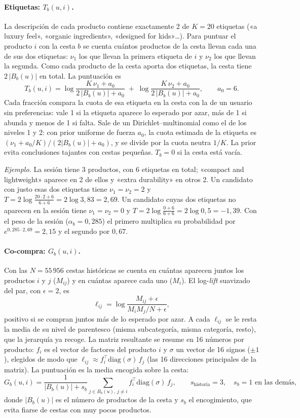 \documentclass[11pt,a4paper]{article}
\begin{document}
\paragraph{Etiquetas: $T_b(u,i)$.} La descripción de cada producto contiene exactamente 2 de $K=20$
etiquetas («a luxury feel», «organic ingredients», «designed for kids»\dots). Para puntuar el producto
$i$ con la cesta $b$ se cuenta cuántos productos de la cesta llevan cada una de sus dos etiquetas:
$\nu_1$ los que llevan la primera etiqueta de $i$ y $\nu_2$ los que llevan la segunda. Como cada producto
de la cesta aporta dos etiquetas, la cesta tiene $2\,|B_b(u)|$ en total. La puntuación es
\[
T_b(u,i)=\log\frac{K\,\nu_1+a_0}{2\,|B_b(u)|+a_0}\;+\;\log\frac{K\,\nu_2+a_0}{2\,|B_b(u)|+a_0},
\qquad a_0=6 .
\]
Cada fracción compara la cuota de esa etiqueta en la cesta con la de un usuario sin preferencias: vale
1 si la etiqueta aparece lo esperado por azar, más de 1 si abunda y menos de 1 si falta. Sale de un
Dirichlet--multinomial como el de los niveles 1 y 2: con prior uniforme de fuerza $a_0$, la cuota
estimada de la etiqueta es $(\nu_1+a_0/K)/(2|B_b(u)|+a_0)$, y se divide por la cuota neutra $1/K$. La
prior evita conclusiones tajantes con cestas pequeñas. $T_b=0$ si la cesta está vacía.

\emph{Ejemplo.} La sesión tiene 3 productos, con 6 etiquetas en total; «compact and lightweight» aparece
en 2 de ellos y «extra durability» en otros 2. Un candidato con justo esas dos etiquetas tiene
$\nu_1=\nu_2=2$ y
$T=2\log\frac{20\cdot2+6}{6+6}=2\log 3{,}83=2{,}69$. Un candidato cuyas dos etiquetas no aparecen en
la sesión tiene $\nu_1=\nu_2=0$ y $T=2\log\frac{0+6}{6+6}=2\log 0{,}5=-1{,}39$. Con el peso de
la sesión ($\alpha_b=0{,}285$) el primero multiplica su probabilidad por $e^{0{,}285\cdot2{,}69}=2{,}15$ y el
segundo por $0{,}67$.

\paragraph{Co-compra: $G_b(u,i)$.} Con las $N=55\,956$ cestas históricas se cuenta en cuántas aparecen
juntos los productos $i$ y $j$ ($M_{ij}$) y en cuántas aparece cada uno ($M_i$). El log-\emph{lift}
suavizado del par, con $\epsilon=2$, es
\[
\ell_{ij}=\log\frac{M_{ij}+\epsilon}{M_iM_j/N+\epsilon},
\]
positivo si se compran juntos más de lo esperado por azar. A cada $\ell_{ij}$ se le resta la media de su
nivel de parentesco (misma subcategoría, misma categoría, resto), que la jerarquía ya recoge. La matriz
resultante se resume en 16 números por producto: $f_i$ es el vector de factores del producto $i$ y
$\sigma$ un vector de 16 signos ($\pm1$), elegidos de modo que
$\ell_{ij}\approx f_i^{\top}\mathrm{diag}(\sigma)\,f_j$ (las 16 direcciones principales de la matriz). La
puntuación es la media encogida sobre la cesta:
\[
G_b(u,i)=\frac{1}{|B_b(u)|+s_b}\sum_{j\in B_b(u),\,j\neq i} f_i^{\top}\mathrm{diag}(\sigma)\,f_j ,
\qquad s_{\text{historia}}=3,\quad s_b=1\text{ en las demás},
\]
donde $|B_b(u)|$ es el número de productos de la cesta y $s_b$ el encogimiento, que evita fiarse de
cestas con muy pocos productos.
\end{document}
